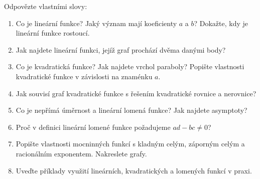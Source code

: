 \begin{problem}
  Odpovězte vlastními slovy:
  \begin{enumerate}
    \item Co je lineární funkce? Jaký význam mají koeficienty $a$ a $b$? Dokažte, kdy je lineární funkce rostoucí.
    \item Jak najdete lineární funkci, jejíž graf prochází dvěma danými body?
    \item Co je kvadratická funkce? Jak najdete vrchol paraboly? Popište vlastnosti kvadratické funkce v závislosti na znaménku $a$.
    \item Jak souvisí graf kvadratické funkce s řešením kvadratické rovnice a nerovnice?
    \item Co je nepřímá úměrnost a lineární lomená funkce? Jak najdete asymptoty?
    \item Proč v definici lineární lomené funkce požadujeme $ad - bc\neq 0$?
    \item Popište vlastnosti mocninných funkcí s kladným celým, záporným celým a racionálním exponentem. Nakreslete grafy.
    \item Uveďte příklady využití lineárních, kvadratických a lomených funkcí v praxi.
  \end{enumerate}
\end{problem}
